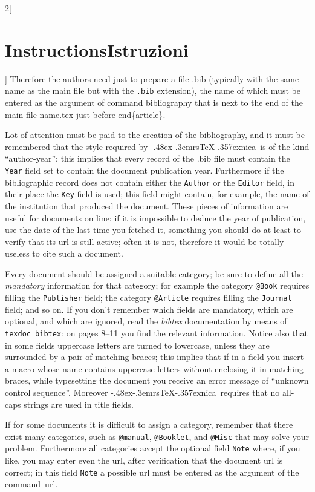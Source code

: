 \documentclass[12pt]{article}
\DeclareRobustCommand*{\Ars}{\textsf{\lower -.48ex\hbox{\rotatebox{-20}{A}}\kern -.3em{rs}}\discretionary{-}{}{\kern -.05em}\TeX\discretionary{-}{}{\kern -.17em}\lower -.357ex\hbox{nica}}
\providecommand\file[1]{\textnormal{\ttfamily#1}}
\providecommand\cs[1]{\textnormal{\ttfamily\char92#1}}
\providecommand\Marg[1]{\textnormal{\ttfamily\{#1\}}}
\providecommand\prog[1]{\textnormal{\ttfamily\itshape#1}}
\providecommand\Eambiente[1]{\cs{end}\Marg{#1}}
\begin{document}
\begin{paracol}{2}[\section{Instructions\hspace{5.6em}Istruzioni}]
Therefore the authors need just to prepare a file \file{.bib} (typically  with the same name as the main file but with the \texttt{.bib} extension), the name of which must be entered as the argument of command \cs{bibliography} that is next to the end of the main file \file{name.tex} just before \Eambiente{article}.

Lot of attention must be paid to the creation of the bibliography, and it must be remembered that the style required by \Ars\ is of the kind “author-year”; this implies that every record of the \file{.bib} file must contain the \texttt{Year} field set to contain the document publication year. Furthermore if the bibliographic record does not contain either the \texttt{Author} or the \texttt{Editor} field, in their place the \texttt{Key} field is used; this field might contain, for example, the name of the institution that produced the document. These pieces of information are useful for documents on line: if it is impossible to deduce the year of publication, use the date of the last time you fetched it, something you should do at least to verify that its url is still active; often it is not, therefore it would be totally useless to cite such a document.

Every document should be assigned a suitable category; be sure to define all the \emph{mandatory} information for that category; for example the category \texttt{@Book} requires filling the \texttt{Publisher} field; the category \texttt{@Article} requires filling the \texttt{Journal} field; and so on. If you don't remember which fields are mandatory, which are optional, and which are ignored, read the \prog{bibtex} documentation by means of \texttt{texdoc bibtex}: on pages 8–11 you find the relevant information. Notice also that in some fields uppercase letters are turned to lowercase, unless they are surrounded by a pair of matching braces; this implies that if in a field you insert a macro whose name contains uppercase letters without enclosing it in matching braces, while typesetting the document you receive an error message of “unknown control sequence”. Moreover \Ars\ requires that no all-caps strings are used in title fields.

If for some documents it is difficult to assign a category, remember that there exist many categories, such as \texttt{@manual}, \texttt{@Booklet}, and \texttt{@Misc} that may solve your problem. Furthermore all categories accept the optional field \texttt{Note} where, if you like, you may enter even the url, after verification that the document url is correct; in this field \texttt{Note} a possible url must be entered as the argument of the command~\cs{url}.


\end{paracol}
\end{document}
